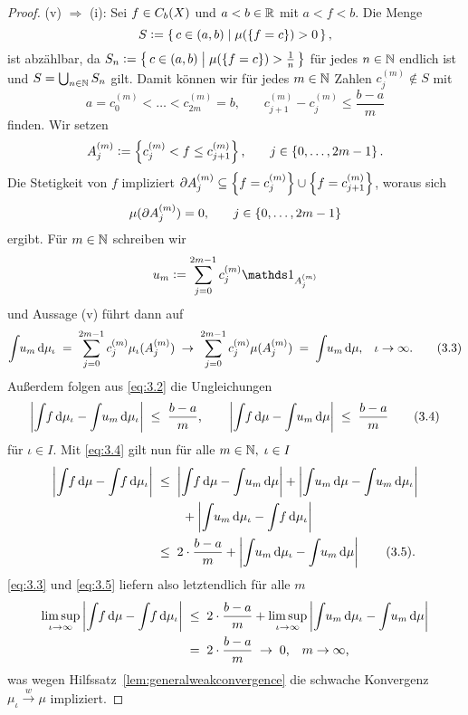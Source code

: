 \documentclass[../main/main.tex]{subfiles}
\begin{document}
\begin{proof}
		(v) $\Rightarrow$ (i): Sei $f \in C_b(X)$ und $a < b \in \mathbb{R}$ 
		mit $a < f < b$. Die Menge
		$$S \vcentcolon = \left\{\, c \in (a, b) \; \middle| \; \mu(\left\{f = c\right\}) > 0 \,\right\} \text{,}$$
		ist abzählbar, da 
		$S_n \vcentcolon = \left\{\, c \in (a, b) \; \middle| \; \mu(\left\{f = c\right\}) > \frac{1}{n} \,\right\}$ 
		für jedes $n \in \mathbb{N}$ endlich ist und $S = \bigcup_{n \in \mathbb{N}} S_n$ gilt.
		Damit können wir für jedes $m \in \mathbb{N}$ Zahlen $c_j^{(m)} \notin S$ mit
		\[a = c_0^{(m)} < \dots < c_{2m}^{(m)} = 
		b \text{,} \qquad c_{j+1}^{(m)} - c_j^{(m)} \leq \frac{b-a}{m} 
		\label{eq:3.2} \tag{3.2}\]
		finden. Wir setzen
		$$A_j^{(m)} \vcentcolon = \left\{c_j^{(m)} < f \leq c_{j+1}^{(m)}\right\}\text{,}
		\qquad j \in \left\{0,\dots,2m-1\right\} \text{.}$$ 
		Die Stetigkeit von $f$ impliziert 
		$\partial A_j^{(m)} \subseteq \left\{f = c_j^{(m)}\right\} \cup \left\{f = c_{j+1}^{(m)}\right\}$, 
		woraus sich 
		$$\mu(\partial A_j^{(m)}) = 0 \text{,} \qquad j \in \left\{0,\dots,2m-1\right\}$$
		ergibt. Für $m \in \mathbb{N}$ schreiben wir
		$$u_m \defby \sum_{j=0}^{2m-1} c_j^{(m)} \indfct_{A_j^{(m)}}$$
		und Aussage (v) führt dann auf
		\[\int_{} \, u_m \, \mathrm{d}\mu_\iota \; = \; \sum_{j=0}^{2m-1} c_j^{(m)} \mu_\iota(A_j^{(m)}) 
		\; \to \; \sum_{j=0}^{2m-1} c_j^{(m)} \mu(A_j^{(m)}) \; = \; 
		\int_{} \, u_m \, \mathrm{d}\mu \text{,} \quad \iota \to \infty \text{.} 
		\label{eq:3.3} \tag{3.3}\]
		Außerdem folgen aus \eqref{eq:3.2} die Ungleichungen
		\[\left| \int_{} \, f \, \mathrm{d}\mu_\iota - \int_{} \, u_m \, \mathrm{d}\mu_\iota \right| \; \leq \; 
		\frac{b-a}{m} \text{,} \qquad 
		\left| \int_{} \, f \, \mathrm{d}\mu - \int_{} \, u_m \, \mathrm{d}\mu \right| \; \leq \; 
		\frac{b-a}{m} \label{eq:3.4} \tag{3.4}\]
		für $\iota \in I$.
		Mit \eqref{eq:3.4} gilt nun für alle $m \in \mathbb{N}, \; \iota \in I$
		\begin{align*}
			\left| \int_{} \, f \, \mathrm{d}\mu - \int_{} \, f \, \mathrm{d}\mu_\iota \right| \; &\leq \; 
			\left| \int_{} \, f \, \mathrm{d}\mu - \int_{} \, u_m \, \mathrm{d}\mu \right| + 
			\left| \int_{} \, u_m \, \mathrm{d}\mu - \int_{} \, u_m \, \mathrm{d}\mu_\iota \right| \\ & \qquad + 
			\left| \int_{} \, u_m \, \mathrm{d}\mu_\iota - \int_{} \, f \, \mathrm{d}\mu_\iota \right| \\
			&\leq \; 2 \cdot \frac{b-a}{m} + \left| \int_{} \, u_m \, \mathrm{d}\mu_\iota - 
			\int_{} \, u_m \, \mathrm{d}\mu \right| \label{eq:3.5} \tag{3.5}\text{.}
		\end{align*}
		\eqref{eq:3.3} und \eqref{eq:3.5} liefern also letztendlich für alle $m$
		\begin{align*}
			\limsup_{\iota \to \infty} \left| \int_{} \, f \, \mathrm{d}\mu - 
			\int_{} \, f \, \mathrm{d}\mu_\iota \right|
			\; &\leq \; 2 \cdot \frac{b-a}{m} + 
			\limsup_{\iota \to \infty} \left| \int_{} \, u_m \, \mathrm{d}\mu_\iota - 
			\int_{} \, u_m \, \mathrm{d}\mu \right| \\
			&= \; 2 \cdot \frac{b-a}{m} \; \to \; 0 \text{,} 
			\quad m \to \infty \text{,}
		\end{align*}
		was wegen Hilfssatz~\ref{lem:generalweakconvergence} die schwache Konvergenz $\mu_\iota \xrightarrow{w} \mu$ impliziert.
	\end{proof}
	
\end{document}
